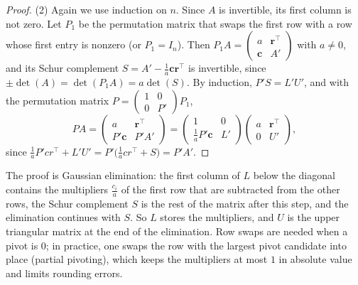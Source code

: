 \begin{proof}
    (2) Again we use induction on $n$. Since $A$ is invertible, its first column is not zero. Let $P_1$ be the permutation matrix that swaps the first row with a row whose first entry is nonzero (or $P_1 = I_n$). Then $P_1A = \begin{pmatrix} a & \mathbf{r}^\top \\ \mathbf{c} & A' \end{pmatrix}$ with $a \neq 0$, and its Schur complement $S = A' - \frac{1}{a}\mathbf{c}\mathbf{r}^\top$ is invertible, since $\pm\det(A) = \det(P_1A) = a\det(S)$. By induction, $P'S = L'U'$, and with the permutation matrix $P = \begin{pmatrix} 1 & 0 \\ 0 & P' \end{pmatrix}P_1$,
    \[PA = \begin{pmatrix} a & \mathbf{r}^\top \\ P'\mathbf{c} & P'A' \end{pmatrix} = \begin{pmatrix} 1 & 0 \\ \frac{1}{a}P'\mathbf{c} & L' \end{pmatrix}\begin{pmatrix} a & \mathbf{r}^\top \\ 0 & U' \end{pmatrix},\]
    since $\frac{1}{a}P'cr^\top + L'U' = P'\big(\frac{1}{a}cr^\top + S\big) = P'A'$.
\end{proof}

The proof is Gaussian elimination: the first column of $L$ below the diagonal contains the multipliers $\frac{c_i}{a}$ of the first row that are subtracted from the other rows, the Schur complement $S$ is the rest of the matrix after this step, and the elimination continues with $S$. So $L$ stores the multipliers, and $U$ is the upper triangular matrix at the end of the elimination. Row swaps are needed when a pivot is $0$; in practice, one swaps the row with the largest pivot candidate into place (partial pivoting), which keeps the multipliers at most $1$ in absolute value and limits rounding errors.

